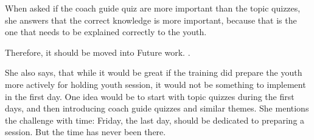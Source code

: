 When asked if the coach guide quiz are more important than the topic quizzes, she answers that the correct knowledge is more important, because that is the one that needs to be explained correctly to the youth.

Therefore, it should be moved into Future work. .

She also says, that while it would be great if the training did prepare the youth more actively for holding youth session, it would not be something to implement in the first day. One idea would be to start with topic quizzes during the first days, and then introducing coach guide quizzes and similar themes. She mentions the challenge with time: Friday, the last day, should be dedicated to preparing a session. But the time has never been there.
